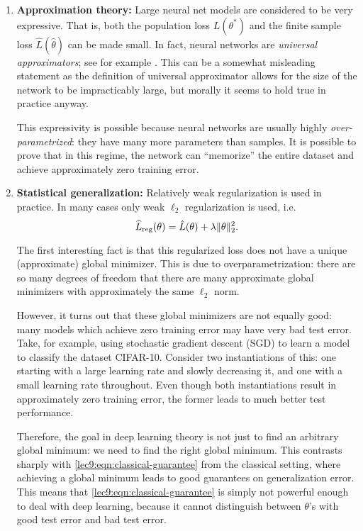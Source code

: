 \begin{enumerate} 
\item {\bf Approximation theory:} Large neural net models are considered to be very expressive. That is, both the population loss $L(\theta^*)$ and the finite sample loss $\hat{L}(\hat\theta)$ can be made small. In fact, neural networks are \textit{universal approximators}; see for example \cite{hornik1991}. This can be a somewhat misleading statement as the definition of universal approximator allows for the size of the network to be impracticably large, but morally it seems to hold true in practice anyway.
        
This expressivity is possible because neural networks are usually highly \textit{over-parametrized}: they have many more parameters than samples. It is possible to prove that in this regime, the network can ``memorize'' the entire dataset and achieve approximately zero training error.
    
\item {\bf Statistical generalization:} Relatively weak regularization is used in practice. In many cases only weak $\ell_2$ regularization is used, i.e.
\begin{equation}
\widehat{L}_{\textup{reg}}(\theta)=\hat{L}(\theta)+\lambda\|\theta\|_2^2.
\end{equation}
    
The first interesting fact is that this regularized loss does not have a unique (approximate) global minimizer. This is due to overparametrization: there are so many degrees of freedom that there are many approximate global minimizers with approximately the same $\ell_2$ norm.
    
However, it turns out that these global minimizers are not equally good: many models which achieve zero training error may have very bad test error. Take, for example, using stochastic gradient descent (SGD) to learn a model to classify the dataset CIFAR-10. Consider two instantiations of this: one starting with a large learning rate and slowly decreasing it, and one with a small learning rate throughout. Even though both instantiations result in approximately zero training error, the former leads to much better test performance. 

Therefore, the goal in deep learning theory is not just to find an arbitrary global minimum: we need to find the right global minimum. This contrasts sharply with \eqref{lec9:eqn:classical-guarantee} from the classical setting, where achieving a global minimum leads to good guarantees on generalization error. This means that \eqref{lec9:eqn:classical-guarantee} is simply not powerful enough to deal with deep learning, because it cannot distinguish between $\theta$'s with good test error and bad test error.


\end{enumerate}
